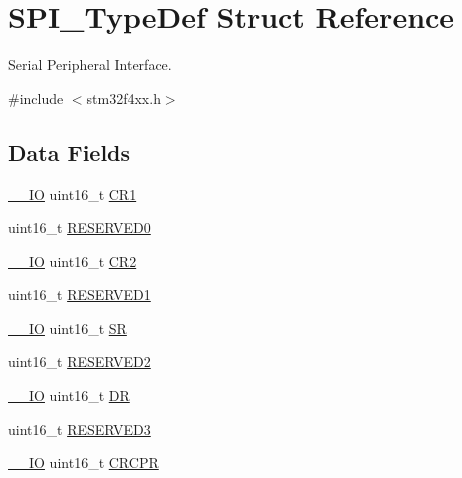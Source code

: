 \hypertarget{struct_s_p_i___type_def}{}\section{S\+P\+I\+\_\+\+Type\+Def Struct Reference}
\label{struct_s_p_i___type_def}


Serial Peripheral Interface.  




{\ttfamily \#include $<$stm32f4xx.\+h$>$}

\subsection*{Data Fields}
\begin{DoxyCompactItemize}
\item 
\hyperlink{group___c_m_s_i_s__core__definitions_gaec43007d9998a0a0e01faede4133d6be}{\+\_\+\+\_\+\+IO} uint16\+\_\+t \hyperlink{struct_s_p_i___type_def_a61400ce239355b62aa25c95fcc18a5e1}{C\+R1}
\item 
uint16\+\_\+t \hyperlink{struct_s_p_i___type_def_a149feba01f9c4a49570c6d88619f504f}{R\+E\+S\+E\+R\+V\+E\+D0}
\item 
\hyperlink{group___c_m_s_i_s__core__definitions_gaec43007d9998a0a0e01faede4133d6be}{\+\_\+\+\_\+\+IO} uint16\+\_\+t \hyperlink{struct_s_p_i___type_def_a2a3e81bd118d1bc52d24a0b0772e6a0c}{C\+R2}
\item 
uint16\+\_\+t \hyperlink{struct_s_p_i___type_def_a8249a3955aace28d92109b391311eb30}{R\+E\+S\+E\+R\+V\+E\+D1}
\item 
\hyperlink{group___c_m_s_i_s__core__definitions_gaec43007d9998a0a0e01faede4133d6be}{\+\_\+\+\_\+\+IO} uint16\+\_\+t \hyperlink{struct_s_p_i___type_def_a44962ea5442d203bf4954035d1bfeb9d}{SR}
\item 
uint16\+\_\+t \hyperlink{struct_s_p_i___type_def_a5573848497a716a9947fd87487709feb}{R\+E\+S\+E\+R\+V\+E\+D2}
\item 
\hyperlink{group___c_m_s_i_s__core__definitions_gaec43007d9998a0a0e01faede4133d6be}{\+\_\+\+\_\+\+IO} uint16\+\_\+t \hyperlink{struct_s_p_i___type_def_a0a1acc0425516ff7969709d118b96a3b}{DR}
\item 
uint16\+\_\+t \hyperlink{struct_s_p_i___type_def_a6c3b31022e6f59b800e9f5cc2a89d54c}{R\+E\+S\+E\+R\+V\+E\+D3}
\item 
\hyperlink{group___c_m_s_i_s__core__definitions_gaec43007d9998a0a0e01faede4133d6be}{\+\_\+\+\_\+\+IO} uint16\+\_\+t \hyperlink{struct_s_p_i___type_def_a942ae09a7662bad70ef336f2bed43a19}{C\+R\+C\+PR}

\end{DoxyCompactItemize}
